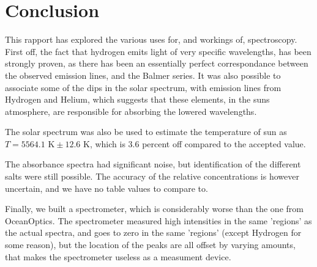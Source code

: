 \chapter{Conclusion}
This rapport has explored the various uses for, and workings of, spectroscopy.
First off, the fact that hydrogen emits light of very specific wavelengths, 
has been strongly proven, as there has been an essentially perfect correspondance between the observed emission lines, and the Balmer series.
It was also possible to associate some of the dips in the solar spectrum, with emission lines from Hydrogen and Helium,
which suggests that these elements, in the suns atmosphere, are responsible for absorbing the lowered wavelengths.

The solar spectrum was also be used to estimate the temperature of sun as $T = 5564.1 \text{ K} \pm 12.6 \text{ K}$,
which is 3.6 percent off compared to the accepted value.

The absorbance spectra had significant noise, but identification of the different salts were still possible.
The accuracy of the relative concentrations is however uncertain, and we have no table values to compare to.

Finally, we built a spectrometer, which is considerably worse than the one from OceanOptics.
The spectrometer measured high intensities in the same 'regions' as the actual spectra, and goes to zero in the same 'regions' (except Hydrogen for some reason), 
but the location of the peaks are all offset by varying amounts, that makes the spectrometer useless as a measument device.
